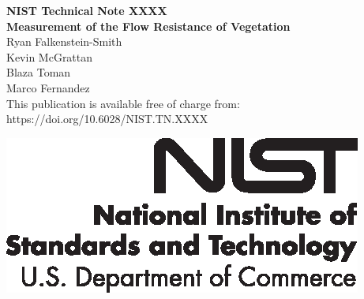 \documentclass[12pt]{article}
\newcommand{\pubnumber}{XXXX}
\newcommand{\DOI}{https://doi.org/10.6028/NIST.TN.XXXX}
\begin{document}
\pagestyle{empty}
	
	\begin{titlepage}
		\begin{flushright}
\LARGE{\textbf{NIST Technical Note \pubnumber}}\\
\vfill
\Huge{\textbf{Measurement of the Flow Resistance of Vegetation}}\\
\vfill
\large Ryan Falkenstein-Smith\\
\large Kevin McGrattan\\
\large Blaza Toman\\
\large Marco Fernandez \\
\vfill
\normalsize This publication is available free of charge from:\\
\DOI\\
\vfill

\includegraphics[width=0.3\linewidth]{NIST-logo.eps}\\


\end{flushright}
\end{titlepage}
\end{document}
